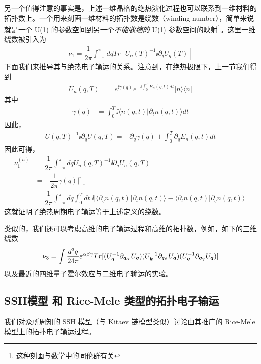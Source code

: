 另一个值得注意的事实是，上述一维晶格的绝热演化过程也可以联系到一维材料的拓扑数上。一个用来刻画一维材料的拓扑数是绕数（winding number），简单来说就是一个 U(1) 的参数空间到另一个\textit{不能收缩的} U(1) 参数空间的映射\footnote{这种刻画与数学中的同伦群有关}。这里一维绕数被引入为\cite{kitagawa2010,topoclassify2016}
\begin{align}
\nu_1=\dfrac{1}{2\pi}\int_{-\pi}^{\pi}dq Tr[U_q(T)^{-1}\ii\partial_qU_q(T)]\label{wind}
\end{align}
下面我们来推导其与绝热电子输运的关系。注意到，在绝热极限下，上一节我们得到
\begin{align}
U_n(q,T) &= e^{\ii\gamma(q)}e^{-\ii\int_0^TE_n(q,t)dt}|n\rangle\langle n|
\end{align}
其中
\begin{align}
\gamma(q) &=\int_0^T\ii\langle n(q,t)|\partial_tn(q,t)\rangle dt
\end{align}
因此，
\begin{align}
U(q,T)^{-1}\ii\partial_qU(q,T)=-\partial_q\gamma(q)+\int_0^T\partial_qE_n(q,t)dt
\end{align}
因此可得，
\begin{align}
\nu_1^{(n)}&= \dfrac{1}{2\pi}\int_{-\pi}^{\pi}dq U_n(q,T)^{-1}\ii\partial_qU_n(q,T)\\
&= -\dfrac{1}{2\pi}\gamma(q)\bigg|_{-\pi}^{\pi}\\
&= \dfrac{1}{2\pi}\int_{-\pi}^{\pi}dq\int_0^Tdt\;\ii\bigg[\langle\partial_qn(q,t)|\partial_tn(q,t)\rangle-\langle\partial_tn(q,t)|\partial_qn(q,t)\rangle\bigg]
\end{align}
这就证明了绝热周期电子输运等于上述定义的绕数。

类似的，我们还可以考虑高维的电子输运过程和高维的拓扑数，例如，如下的三维绕数
\begin{align}
\nu_3=\int\dfrac{d^3q}{24\pi}\varepsilon^{\alpha\beta\gamma}Tr[(U_{\boldsymbol{q}}^{-1}\partial_{\boldsymbol{q_{\alpha}}}U_{\boldsymbol{q}})(U_{\boldsymbol{k}}^{-1}\partial_{\boldsymbol{q_{\beta}}}U_{\boldsymbol{q}})(U_{\boldsymbol{q}}^{-1}\partial_{\boldsymbol{q_{\gamma}}}U_{\boldsymbol{q}})]
\end{align}
以及最近的四维量子霍尔效应与二维电子输运的实验\cite{4dqhall-expr-2018}。


\subsection{SSH模型 和 Rice-Mele 类型的拓扑电子输运}\label{sec:ssh}

我们对众所周知的 SSH 模型\cite{ssh1979}（与 Kitaev 链模型\cite{kitaev2001}类似）讨论由其推广的 Rice-Mele 模型上的拓扑电子输运过程。

